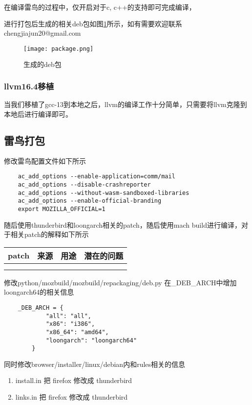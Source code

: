 \documentclass[lang=cn,a4paper,newtx]{elegantpaper}
\begin{document}
在编译雷鸟的过程中，仅开启对于c, c++的支持即可完成编译，

进行打包后生成的相关deb包如图\ref{deb}所示，如有需要欢迎联系chengjiajun20@gmail.com

\begin{figure}[!htb]
    \centering
    \texttt{[image: package.png]}
    \caption{生成的deb包}
    \label{deb}
\end{figure}

\subsubsection{llvm16.4移植}

当我们移植了gcc-13到本地之后，llvm的编译工作十分简单，只需要将llvm克隆到本地后进行编译即可。

\subsection{雷鸟打包}

修改雷鸟配置文件如下所示
\begin{lstlisting} 
    ac_add_options --enable-application=comm/mail
    ac_add_options --disable-crashreporter
    ac_add_options --without-wasm-sandboxed-libraries
    ac_add_options --enable-official-branding
    export MOZILLA_OFFICIAL=1
\end{lstlisting}

随后使用thunderbird和loongarch相关的patch，随后使用mach build进行编译，对于相关patch的解释如下所示

\begin{center}
    \begin{tabular}{cccc}
        \toprule
        patch & 来源 & 用途 & 潜在的问题\\
        \midrule
        &  &  & \\
        &  &  & \\
        \bottomrule
    \end{tabular}
\end{center}

修改python/mozbuild/mozbuild/repackaging/deb.py 在\_DEB\_ARCH中增加loongarch64的相关信息

\begin{lstlisting}
    _DEB_ARCH = {
            "all": "all",
            "x86": "i386",
            "x86_64": "amd64",
            "loongarch": "loongarch64"
        }
\end{lstlisting}

同时修改browser/installer/linux/debian内和rules相关的信息
\begin{enumerate}
    \item install.in 把 firefox 修改成 thunderbird
    \item links.in 把 firefox 修改成 thunderbird
\end{enumerate}
\end{document}
